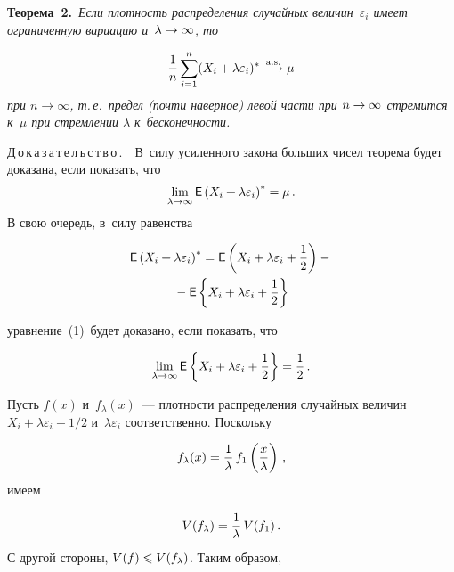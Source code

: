 \begin{multicols}{2}
\vspace*{2pt}

\noindent
\textbf{Теорема~2.}\ \textit{Если плотность распределения случайных 
величин~$\varepsilon_i$
имеет ограниченную вариацию и~$\lambda\hm\to\infty$, то}

\noindent
$$
\displaystyle\frac{\displaystyle 1\mathstrut}{\displaystyle n\mathstrut}\sum\limits_{i=1}^n(X_i+\lambda\varepsilon_i)^\ast
\stackrel{\mathrm{a.s.}}{\longrightarrow}\mu
$$
\textit{при $n\to\infty$, т.\,е.\ предел (почти наверное) левой час\-ти при $n\hm\to\infty$
стремится к~$\mu$ при стремлении $\lambda$ к~бесконечности.}

\smallskip

\noindent
Д\,о\,к\,а\,з\,а\,т\,е\,л\,ь\,с\,т\,в\,о\,.\ \ 
В~силу усиленного закона больших чисел теорема будет доказана,
если  показать, что
\begin{equation}
\lim\limits_{\lambda\to\infty}{\sf E}\left(X_i+\lambda\varepsilon_i\right)^\ast=\mu\,.
\label{e1-us}
\end{equation}
В свою очередь, в~силу равенства

\vspace*{-2pt}

\noindent
\begin{multline*}
{\sf E}\left(X_i+\lambda\varepsilon_i\right)^\ast=
{\sf E}\left(X_i+\lambda\varepsilon_i+\displaystyle\frac{\displaystyle 1\mathstrut}{\displaystyle 2\mathstrut}\right)-{}\\
{}-
{\sf E}\left\{X_i+\lambda\varepsilon_i+\displaystyle\frac{\displaystyle 1\mathstrut}{\displaystyle 2\mathstrut}\right\}
\end{multline*}

\noindent
уравнение~(1)~будет доказано, если  показать, что

\noindent
\begin{equation}
\lim\limits_{\lambda\to\infty}{\sf E}\left\{X_i+\lambda\varepsilon_i+
\displaystyle\frac{\displaystyle 1\mathstrut}{\displaystyle 2\mathstrut}\right\}=\displaystyle\frac{\displaystyle 1\mathstrut}{\displaystyle 2\mathstrut}\,.
\label{e2-us}
\end{equation}

Пусть $f(x)$ и~$f_\lambda(x)$~--- плотности распределения случайных величин
$X_i+\lambda\varepsilon_i+1/2$ и~$\lambda\varepsilon_i$ соответственно.
Поскольку

\vspace*{2pt}

\noindent
$$
f_\lambda(x)=\displaystyle\frac{\displaystyle 1\mathstrut}{\displaystyle \lambda\mathstrut}\,f_1\left(\displaystyle\frac{\displaystyle x\mathstrut}{\displaystyle \lambda\mathstrut}\right)\,,
$$
имеем

\noindent
$$
{V}(f_\lambda)=\displaystyle\frac{\displaystyle 1\mathstrut}{\displaystyle \lambda\mathstrut}\,{V}(f_1)\,.
$$
С другой стороны, ${V}(f)\hm\leqslant {V}(f_\lambda)$. Таким образом,

\vspace*{3pt}


\end{multicols}

